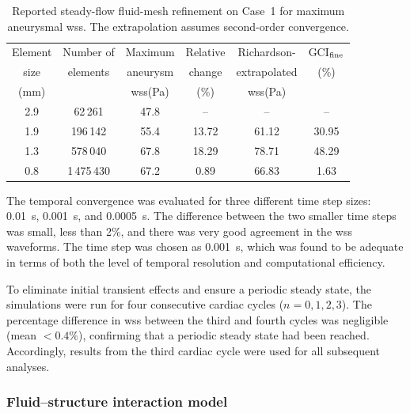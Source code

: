 \documentclass[12pt,a4paper]{article}
\newcommand{\cfdrevision}[1]{#1} %
\newcommand{\WSS}{\ac{wss}\xspace}
\theoremstyle{definition}
\numberwithin{equation}{section}
\providecommand{\DIFaddtex}[1]{{\protect\color{blue} \sf #1}} %
\providecommand{\DIFaddFL}[1]{\DIFadd{#1}} %
\providecommand{\DIFaddbeginFL}{} %
\providecommand{\DIFaddendFL}{} %
\providecommand{\DIFadd}[1]{\texorpdfstring{\DIFaddtex{#1}}{#1}} %
\newcommand{\DIFaddincludegraphics}[2][]{{\color{blue}\fbox{\DIFOincludegraphics[#1]{#2}}}} %
\DeclareRobustCommand{\DIFaddbeginFL}{\DIFOaddbeginFL \let\includegraphics\DIFaddincludegraphics} %
\DeclareRobustCommand{\DIFaddendFL}{\DIFOaddendFL \let\includegraphics\DIFOincludegraphics} %
\begin{document}
\begin{table}[ht!]
\centering
\setlength{\tabcolsep}{3.5pt}
\caption{Reported steady-flow fluid-mesh refinement \DIFaddbeginFL \DIFaddFL{\cfdrevision{on Case~1} }\DIFaddendFL for maximum aneurysmal \WSS. The extrapolation assumes second-order convergence.}
\label{tab:mesh_study}
\setlength{\tabcolsep}{7pt}
\begin{tabular}{cccccc}
\toprule
Element & Number of & Maximum & Relative & Richardson- & GCI$_{\rm fine}$ \\
size & elements & aneurysm & change & extrapolated & (\%) \\
(mm) & & \WSS (Pa) & (\%) & \WSS (Pa) & \\
\midrule
2.9 & 62\,261    & 47.8 & --    & --    & -- \\
1.9 & 196\,142   & 55.4 & 13.72 & 61.12 & 30.95 \\
1.3 & 578\,040   & 67.8 & 18.29 & 78.71 & 48.29 \\
0.8 & 1\,475\,430 & 67.2 & 0.89  & 66.83 & 1.63 \\
\bottomrule
\end{tabular}
\end{table}


The temporal convergence was evaluated for three different time step sizes: 0.01~s, 0.001~s, and 0.0005~s. The difference between the two smaller time steps was small, less than 2\%, and there was very good agreement in the \WSS waveforms. The time step was chosen as 0.001~s, which was found to be adequate in terms of both the level of temporal resolution and computational efficiency.

To eliminate initial transient effects and ensure a periodic steady state, the simulations were run for four consecutive cardiac cycles (\(n = 0,1,2,3\)). The percentage difference in \WSS between the third and fourth cycles was negligible (mean \(< 0.4\%\)), confirming that a periodic steady state had been reached. Accordingly, results from the third cardiac cycle were used for all subsequent analyses.



\subsubsection{Fluid--structure interaction model}
\end{document}
